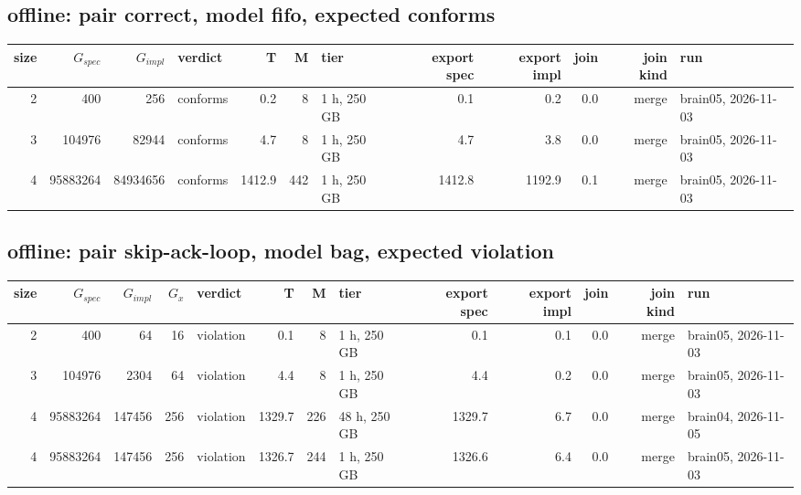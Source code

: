 \documentclass[10pt]{article}
\begin{document}
\subsection*{offline: pair \textsf{correct}, model fifo, expected conforms}
\begin{longtable}{@{}rrrlrrlrrrrl@{}}
\toprule
size & $G_{\mathit{spec}}$ & $G_{\mathit{impl}}$ & verdict & T & M & tier & export spec & export impl & join & join kind & run \\
\midrule
\endhead
\color{blue} 2 & 400 & 256 & conforms & 0.2 & 8 & 1 h, 250 GB & 0.1 & 0.2 & 0.0 & merge & brain05, 2026-11-03 \\
\color{blue} 3 & 104976 & 82944 & conforms & 4.7 & 8 & 1 h, 250 GB & 4.7 & 3.8 & 0.0 & merge & brain05, 2026-11-03 \\
\color{blue} 4 & 95883264 & 84934656 & conforms & 1412.9 & 442 & 1 h, 250 GB & 1412.8 & 1192.9 & 0.1 & merge & brain05, 2026-11-03 \\
\bottomrule
\end{longtable}
\subsection*{offline: pair \textsf{skip-ack-loop}, model bag, expected violation}
\begin{longtable}{@{}rrrrlrrlrrrrl@{}}
\toprule
size & $G_{\mathit{spec}}$ & $G_{\mathit{impl}}$ & $G_x$ & verdict & T & M & tier & export spec & export impl & join & join kind & run \\
\midrule
\endhead
\color{blue} 2 & 400 & 64 & 16 & violation & 0.1 & 8 & 1 h, 250 GB & 0.1 & 0.1 & 0.0 & merge & brain05, 2026-11-03 \\
\color{blue} 3 & 104976 & 2304 & 64 & violation & 4.4 & 8 & 1 h, 250 GB & 4.4 & 0.2 & 0.0 & merge & brain05, 2026-11-03 \\
\color{blue} 4 & 95883264 & 147456 & 256 & violation & 1329.7 & 226 & 48 h, 250 GB & 1329.7 & 6.7 & 0.0 & merge & brain04, 2026-11-05 \\
\color{blue} 4 & 95883264 & 147456 & 256 & violation & 1326.7 & 244 & 1 h, 250 GB & 1326.6 & 6.4 & 0.0 & merge & brain05, 2026-11-03 \\
\bottomrule
\end{longtable}
\end{document}
